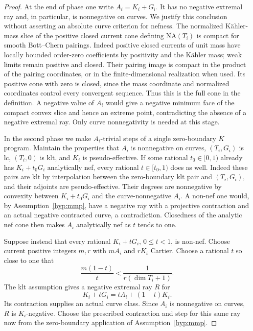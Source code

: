 \documentclass[11pt,letterpaper]{article}
\newcommand{\NA}{\overline{\mathrm{NA}}}
\theoremstyle{definition}
\theoremstyle{remark}
\begin{document}
\begin{proof}
At the end of phase one write $A_i=K_i+G_i$.  It has no negative
extremal ray and, in particular, is nonnegative on curves.  We
justify this conclusion without asserting an absolute curve
criterion for nefness.  The normalized K\"ahler-mass slice of the
positive closed current cone defining
$\NA(T_i)$ is compact for smooth Bott--Chern pairings.
Indeed positive closed currents of unit mass have locally bounded
order-zero coefficients by positivity and the K\"ahler mass; weak
limits remain positive and closed.  Their pairing image is compact
in the product of the pairing coordinates, or in the
finite-dimensional realization when used.  Its positive cone with
zero is closed, since the mass coordinate and normalized
coordinates control every convergent sequence.  Thus this is the
full cone in the definition.  A negative value of $A_i$ would give
a negative minimum face of the compact convex slice and hence an
extreme point, contradicting the absence of a negative extremal
ray.  Only curve nonnegativity is needed at this stage.

In the second phase we make $A_i$-trivial steps of a single
zero-boundary $K$ program.  Maintain the properties that $A_i$ is
nonnegative on curves, $(T_i,G_i)$ is lc, $(T_i,0)$ is klt, and
$K_i$ is pseudo-effective.  If some rational $t_0\in[0,1)$ already
has $K_i+t_0G_i$ analytically nef, every rational $t\in[t_0,1)$
does as well.  Indeed these pairs are klt by interpolation between
the zero-boundary klt pair and $(T_i,G_i)$, and their adjoints are
pseudo-effective.  Their degrees are nonnegative by convexity
between $K_i+t_0G_i$ and the curve-nonnegative $A_i$.  A non-nef
one would, by Assumption~\ref{hyp:mmp}, have a negative ray with a
projective contraction and an actual negative contracted curve, a
contradiction.  Closedness of the analytic nef cone then makes
$A_i$ analytically nef as $t$ tends to one.

Suppose instead that every rational $K_i+tG_i$, $0\leq t<1$, is
non-nef.  Choose current positive integers $m,r$ with $mA_i$ and
$rK_i$ Cartier.  Choose a rational $t$ so close to one that
\begin{equation}
 \frac{m(1-t)}{t}<\frac{1}{r(\dim T_i+1)}.
 \label{bir:near-one-choice}
\end{equation}
The klt assumption gives a negative extremal ray $R$ for
\[
 K_i+tG_i=tA_i+(1-t)K_i.
\]
Its contraction supplies an actual curve class.  Since $A_i$ is
nonnegative on curves, $R$ is $K_i$-negative.  Choose the prescribed
contraction and step for this same ray now from the zero-boundary
application of Assumption~\ref{hyp:mmp}.


\end{proof}
\end{document}
